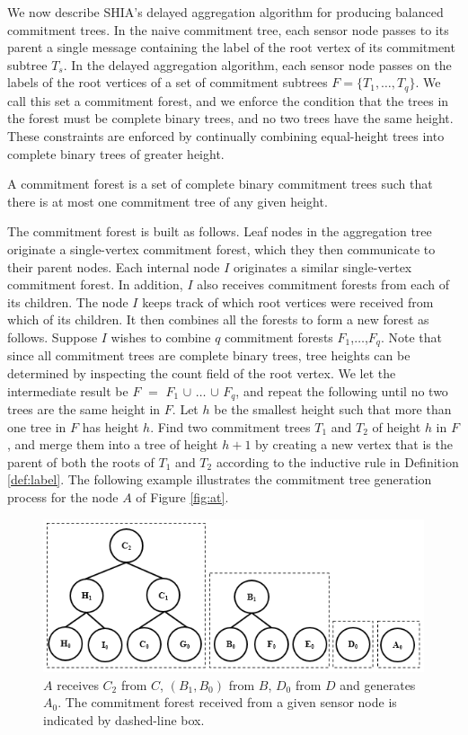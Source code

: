 		We now describe SHIA's delayed aggregation algorithm for producing balanced commitment trees.
		In the naive commitment tree, each sensor node passes to its parent a single message containing the label of the root vertex of its commitment subtree $T_{s}$.
		In the delayed aggregation algorithm, each sensor node passes on the labels of the root vertices of a set of commitment subtrees $F = \{ T_{1}, \dotsc, T_{q} \}$.
		We call this set a commitment forest, and we enforce the condition that the trees in the forest must be complete binary trees, and no two trees have the same height. 
		These constraints are enforced by continually combining equal-height trees into complete binary trees of greater height.
		\begin{definition}
			\cite{chan2006secure}
			\label{def:commitment-forest}
			A commitment forest is a set of complete binary commitment trees such that there is at most one commitment tree of any given height.
		\end{definition}
		The commitment forest is built as follows. 
		Leaf nodes in the aggregation tree originate a single-vertex commitment forest, which they then communicate to their parent nodes. Each internal node $I$ originates a similar single-vertex commitment forest.
		In addition, $I$ also receives commitment forests from each of its children.
		The node $I$ keeps track of which root vertices were received from which of its children.
		It then combines all the forests to form a new forest as follows.
		Suppose $I$ wishes to combine $q$ commitment forests $F_{1}$,$\dotsc$,$F_{q}$.
		Note that since all commitment trees are complete binary trees, tree heights can be determined by inspecting the count field of the root vertex.
		We let the intermediate result be $F$ $=$ $F_{1}$ $\cup$ $\dotsc$ $\cup$ $F_{q}$, and repeat the following until no two trees are the same height in $F$.
		Let $h$ be the smallest height such that more than one tree in $F$ has height $h$.
		Find two commitment trees $T_{1}$ and $T_{2}$ of height $h$ in $F$, and merge them into a tree of height $h + 1$ by creating a new vertex that is the parent of both the roots of $T_{1}$ and $T_{2}$ according to the inductive rule in Definition \ref{def:label}.
		The following example illustrates the commitment tree generation process for the node $A$ of Figure \ref{fig:at}.
		\begin{figure}[h!]
			\includegraphics{images/commitment-tree-example-1-shia.png}
			\caption{$A$ receives $C_{2}$ from $C$, $(B_{1},B_{0})$ from $B$, $D_{0}$ from $D$ and generates $A_{0}$. The commitment forest received from a given sensor node is indicated by dashed-line box.}
			\label{fig:commitment-tree-example-1-shia}
		\end{figure}
